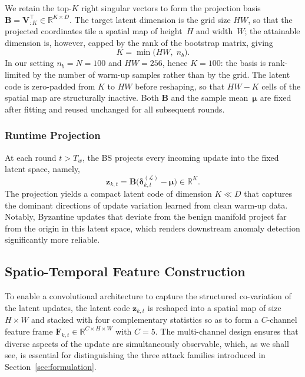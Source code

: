 \documentclass[journal]{IEEEtran}
\begin{document}
We retain the top-$K$ right singular vectors to form the projection basis $\mathbf{B} = \mathbf{V}_{:K}^\top \in \mathbb{R}^{K \times D}$. The target latent dimension is the grid size $HW$, so that the projected coordinates tile a spatial map of height~$H$ and width~$W$; the attainable dimension is, however, capped by the rank of the bootstrap matrix, giving
\begin{equation}
K = \min\bigl(HW,\; n_b\bigr).
\label{eq:latent_dim}
\end{equation}
In our setting $n_b = N = 100$ and $HW = 256$, hence $K = 100$: the basis is rank-limited by the number of warm-up samples rather than by the grid. The latent code is zero-padded from $K$ to $HW$ before reshaping, so that $HW - K$ cells of the spatial map are structurally inactive. Both $\mathbf{B}$ and the sample mean~$\boldsymbol{\mu}$ are fixed after fitting and reused unchanged for all subsequent rounds.

\subsubsection{Runtime Projection}
At each round $t > T_w$, the BS projects every incoming update into the fixed latent space, namely,
\begin{equation}
\mathbf{z}_{k,t} = \mathbf{B}\bigl(\boldsymbol{\delta}_{k,t}^{(\mathcal{L})} - \boldsymbol{\mu}\bigr) \in \mathbb{R}^K.
\label{eq:projection}
\end{equation}
The projection yields a compact latent code of dimension $K \ll D$ that captures the dominant directions of update variation learned from clean warm-up data. Notably, Byzantine updates that deviate from the benign manifold project far from the origin in this latent space, which renders downstream anomaly detection significantly more reliable.

\subsection{Spatio-Temporal Feature Construction}

To enable a convolutional architecture to capture the structured co-variation of the latent updates, the latent code $\mathbf{z}_{k,t}$ is reshaped into a spatial map of size $H \times W$ and stacked with four complementary statistics so as to form a $C$-channel feature frame $\mathbf{F}_{k,t} \in \mathbb{R}^{C \times H \times W}$ with $C = 5$. The multi-channel design ensures that diverse aspects of the update are simultaneously observable, which, as we shall see, is essential for distinguishing the three attack families introduced in Section~\ref{sec:formulation}.
\end{document}
